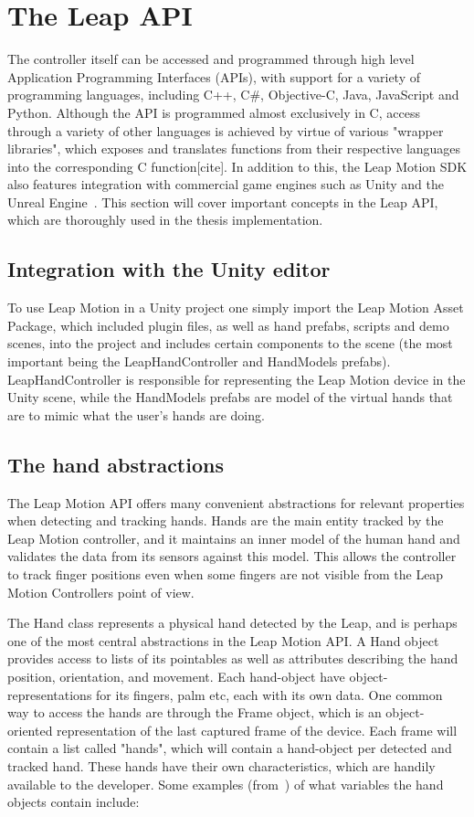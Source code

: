 \section{The Leap API}
The controller itself can be accessed and programmed through high level Application Programming Interfaces (APIs), with support for a variety of programming languages, 
including C++, C\#, Objective-C, Java, JavaScript and Python. Although the API is programmed almost exclusively in C, access through a variety of other languages 
is achieved by virtue of various "wrapper libraries", which exposes and translates functions from their respective languages into the corresponding C function[cite].
In addition to this, the Leap Motion SDK also features integration with commercial game engines such as Unity and the Unreal Engine~\citep{Guna2014}. 
This section will cover important concepts in the Leap API, which are thoroughly used in the thesis implementation.

\subsection{Integration with the Unity editor}
To use Leap Motion in a Unity project one simply import the Leap Motion Asset Package, which included plugin files, as well as hand prefabs, scripts and demo scenes, 
into the project and includes certain components to the scene (the most important being the LeapHandController and HandModels prefabs). LeapHandController is responsible
for representing the Leap Motion device in the Unity scene, while the HandModels prefabs are model of the virtual hands that are to mimic what the user's hands are doing.  


\subsection{The hand abstractions}
The Leap Motion API offers many convenient abstractions for relevant properties when detecting and tracking hands.
Hands are the main entity tracked by the Leap Motion controller, and it maintains an inner model of the human hand and validates the data from 
its sensors against this model. This allows the controller to track finger positions even when some fingers are not visible from the Leap Motion Controllers point of view.

The Hand class represents a physical hand detected by the Leap, and is perhaps one of the most central abstractions in the Leap Motion API. 
A Hand object provides access to lists of its pointables as well as attributes describing the hand position, orientation, and movement.
Each hand-object have object-representations for its fingers, palm etc, each with its own data.
One common way to access the hands are through the Frame object, which is an object-oriented representation of the last captured frame of the device.
Each frame will contain a list called "hands", which will contain a hand-object per detected and tracked hand.
These hands have their own characteristics, which are handily available to the developer. 
Some examples (from~\citet{LeapMotion2016}) of what variables the hand objects contain include:

